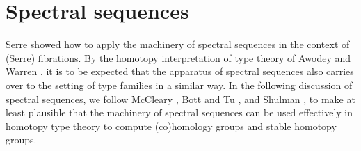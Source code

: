 \documentclass[reqno]{amsart}
\begin{document}
\begin{comment}
\end{enumerate}

May's construction of the functor $B^n$ is by a variant of the bar construction.
The original bar construction was introduced by Eilenberg and Mac Lane, and serves to compute the homology of classifying spaces.

For instance, let $R$ be a ring, and let $A$ be an $R$-algebra. Let $C$ be the category of $R$-modules. Then we define the functor $T:C\to C$ by $T(M):= A\otimes_R M$. Then we have a multiplication $\mu:T^2\to T$ induced by the map $A\otimes_R A\to A$, and a unit $\eta : 1\to T$ induced by the map $R\to A$, satisfying the usual axioms for a monad. An $A$-module (or, $T$-algebra) is the same thing as an $R$-module $M$ with a map $\nu : A\otimes_R M\to M$. The classical bar construction is a tool to compute $\mathrm{Tor}_A(L,M)$. A $T$-functor (or right module functor) is a functor $S:C\to C'$ with a natural transformation $\lambda : ST\to S$, such that $\lambda\circ (\lambda_{T({-})})=\lambda\circ (S\mu)$ and $\lambda\circ (S\eta)=1$. 

We can make these considerations for any adjoint pair of functors. In particular, we have this for the $\Sigma^n\vdash \Omega^n$ adjunction. For any operad $P$, we can construct a functor $P:C\to C$ on the category of compactly generated spaces, so that an action $P\to \mathrm{End}_X$ is the same thing as a map $PX\to X$, making $X$ a $P$-algebra. Then we define
\begin{equation*}
\mathcal{P}X:= \Big(\bigsqcup_n P_{1,n} \times X^n \Big)/\sim
\end{equation*}
where $\sim$ is a suitable equivalence relation.
\end{comment} 

\section{Spectral sequences}
Serre showed how to apply the machinery of spectral sequences in the context
of (Serre) fibrations. By the homotopy interpretation of type theory
of Awodey and Warren \cite{AwodeyWarren}, it is to be expected that the apparatus
of spectral sequences also carries over to the setting of type families in a
similar way. In the following discussion of spectral sequences, we follow
McCleary \cite{McCleary01}, Bott and Tu \cite{BottTu}, and Shulman \cite{Shulman13Spectral},
to make at least plausible that the machinery of spectral sequences can be used
effectively in homotopy type theory to compute (co)homology groups and stable
homotopy groups.
\end{document}

